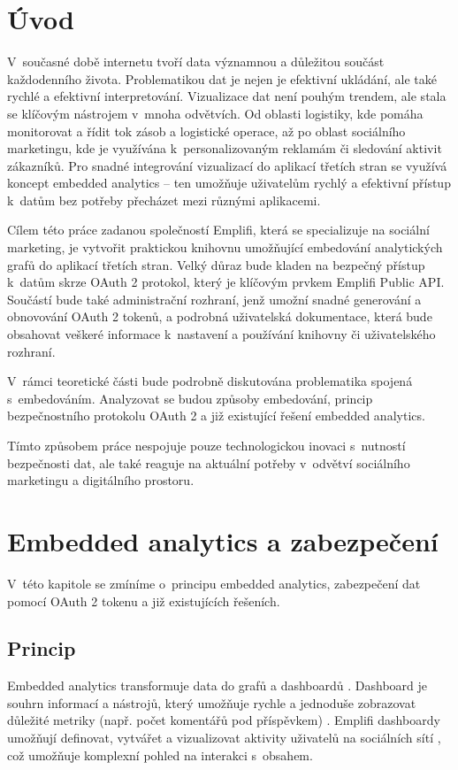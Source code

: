 \documentclass[czech, bc, kiv, he, iso690numb]{fasthesis}
\begin{document}
\chapter{Úvod}
V~současné době internetu tvoří data významnou a důležitou součást každodenního života. Problematikou dat je nejen je efektivní ukládání, 
ale také rychlé a efektivní interpretování. 
Vizualizace dat není pouhým trendem, ale stala se klíčovým nástrojem v~mnoha odvětvích. Od oblasti logistiky, kde pomáha monitorovat a řídit tok zásob a logistické operace, až po oblast sociálního marketingu, kde je využívána k~personalizovaným reklamám či sledování aktivit zákazníků. 
Pro snadné integrování vizualizací do aplikací třetích stran se využívá koncept embedded analytics – ten umožňuje uživatelům rychlý a efektivní přístup k~datům bez potřeby přecházet mezi různými aplikacemi. 

Cílem této práce zadanou společností Emplifi, která se specializuje na sociální marketing, je vytvořit praktickou knihovnu umožňující embedování analytických grafů do aplikací třetích stran. 
Velký důraz bude kladen na bezpečný přístup k~datům skrze OAuth 2 protokol, který je klíčovým prvkem Emplifi Public API. Součástí bude také administrační rozhraní, jenž umožní snadné generování a obnovování OAuth 2 tokenů, a podrobná uživatelská dokumentace, která bude obsahovat veškeré informace k~nastavení a používání knihovny či uživatelského rozhraní.

V~rámci teoretické části bude podrobně diskutována problematika spojená s~embedováním. Analyzovat se budou způsoby embedování, princip bezpečnostního protokolu OAuth 2 a již existující řešení embedded analytics.

Tímto způsobem práce nespojuje pouze technologickou inovaci s~nutností bezpečnosti dat, ale také reaguje na aktuální potřeby v~odvětví sociálního marketingu a digitálního prostoru.
%
%
%
%
\chapter{Embedded analytics a zabezpečení}
V~této kapitole se zmíníme o~principu embedded analytics, zabezpečení dat pomocí OAuth 2 tokenu a již existujících řešeních.

%
%
\section{Princip}
Embedded analytics transformuje data do grafů a dashboardů \cite{goodDataEmbedded}. Dashboard je souhrn informací a nástrojů, který umožňuje rychle a jednoduše zobrazovat důležité metriky (např. počet komentářů pod příspěvkem) \cite{coJeDashboard}.
Emplifi dashboardy umožňují definovat, vytvářet a vizualizovat aktivity uživatelů na sociálních sítí \cite{emplifiDashboard}, což umožňuje komplexní pohled na interakci s~obsahem.
\end{document}

